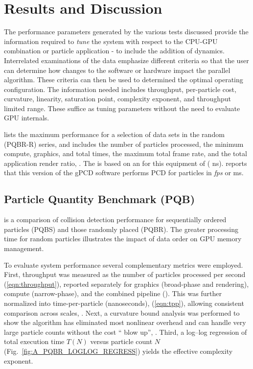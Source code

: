 \section{Results and Discussion} \label{results}


The performance parameters generated by the various tests discussed provide the information required to \textit{tune} the system with respect to the CPU-GPU combination or particle application - to include the addition of dynamics. Interrelated examinations of the data emphasize different criteria so that the user can determine how changes to the software or hardware impact the parallel algorithm. These criteria can then be used to determined the optimal operating configuration. The information needed includes throughput, per-particle cost, curvature, linearity, saturation point, complexity exponent, and throughput limited range. These suffice as tuning parameters without the need to evaluate GPU internals.

 lists the maximum performance for a selection of data sets in the random (PQBR-R) series, and includes the number of particles processed, the minimum compute, graphics, and total times, the maximum total frame rate, and the total application render ratio, \arrt{}. The \arrt{} is based on an \mmrr{} for this equipment of \APQBRTTABLEALLmmrr{} (\APQBRTTABLEALLmmrrns{} ns).  reports that this version of the gPCD software performs PCD for \numprint{\APQBRTTABLEALLbka{}} particles in \APQBRTTABLEALLbkc{} \textit{fps} or \APQBRTTABLEALLbkf{} ms. 

\subsection{Particle Quantity Benchmark (PQB)}\label{pqb}

 is a comparison of collision detection performance for sequentially ordered particles (PQBS) and those randomly placed (PQBR). The greater processing time for random particles illustrates the impact of data order on GPU memory management. 

To evaluate system performance several complementary metrics were employed. First, throughput was measured as the number of particles processed per second (\ref{eqn:throughput}), reported separately for graphics (broad-phase and rendering), compute (narrow-phase), and the combined pipeline (). This was further normalized into time-per-particle (nanoseconds),   (\ref{eqn:tpp}), allowing  consistent comparison across scales, .  Next, a curvature bound analysis was performed to show the algorithm has eliminated most nonlinear overhead and can handle very large particle counts without the cost “\Onsq{} blow up”, . Third, a log--log regression of total execution time $T(N)$ versus particle count $N$  (Fig.~\ref{fig:A_PQBR_LOGLOG_REGRESS}) yields the effective complexity exponent.

